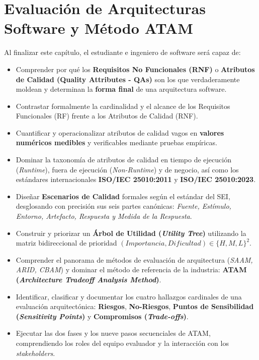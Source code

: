 \chapter{Evaluación de Arquitecturas Software y Método ATAM}
\label{cap:tema4}

\begin{tcolorbox}[
  enhanced,
  colback=primary!5!bglight,
  colframe=primary,
  arc=3mm,
  boxrule=1pt,
  title={\bfseries\color{white} Objetivos de Aprendizaje del Tema 4},
  coltitle=white
]
Al finalizar este capítulo, el estudiante e ingeniero de software será capaz de:
\begin{itemize}[leftmargin=1.5em]
  \item Comprender por qué los \textbf{Requisitos No Funcionales (RNF)} o \textbf{Atributos de Calidad (Quality Attributes - QAs)} son los que verdaderamente moldean y determinan la \textbf{forma final} de una arquitectura software.
  \item Contrastar formalmente la cardinalidad y el alcance de los Requisitos Funcionales (RF) frente a los Atributos de Calidad (RNF).
  \item Cuantificar y operacionalizar atributos de calidad vagos en \textbf{valores numéricos medibles} y verificables mediante pruebas empíricas.
  \item Dominar la taxonomía de atributos de calidad en tiempo de ejecución (\emph{Runtime}), fuera de ejecución (\emph{Non-Runtime}) y de negocio, así como los estándares internacionales \textbf{ISO/IEC 25010:2011} y \textbf{ISO/IEC 25010:2023}.
  \item Diseñar \textbf{Escenarios de Calidad} formales según el estándar del SEI, desglosando con precisión sus seis partes canónicas: \emph{Fuente, Estímulo, Entorno, Artefacto, Respuesta y Medida de la Respuesta}.
  \item Construir y priorizar un \textbf{Árbol de Utilidad (\emph{Utility Tree})} utilizando la matriz bidireccional de prioridad $(Importancia, Dificultad) \in \{H, M, L\}^2$.
  \item Comprender el panorama de métodos de evaluación de arquitectura (\emph{SAAM, ARID, CBAM}) y dominar el método de referencia de la industria: \textbf{ATAM (\emph{Architecture Tradeoff Analysis Method})}.
  \item Identificar, clasificar y documentar los cuatro hallazgos cardinales de una evaluación arquitectónica: \textbf{Riesgos}, \textbf{No-Riesgos}, \textbf{Puntos de Sensibilidad (\emph{Sensitivity Points})} y \textbf{Compromisos (\emph{Trade-offs})}.
  \item Ejecutar las dos fases y los nueve pasos secuenciales de ATAM, comprendiendo los roles del equipo evaluador y la interacción con los \emph{stakeholders}.
\end{itemize}
\end{tcolorbox}

